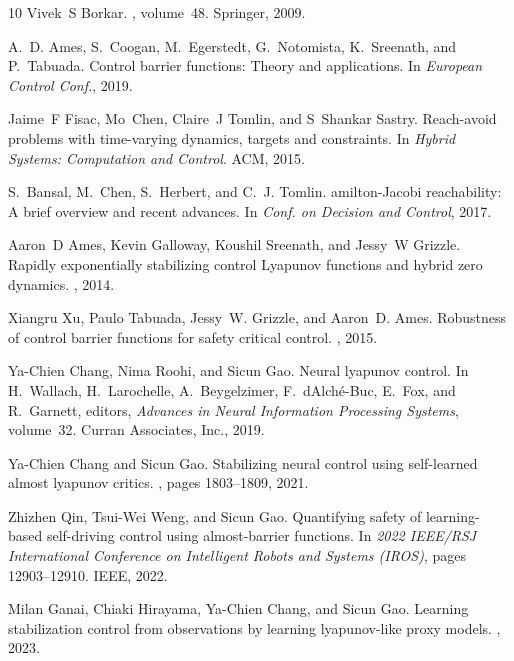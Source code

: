 \documentclass{article}
\theoremstyle{definition}
\begin{document}
\begin{thebibliography}{10}
Vivek~S Borkar.
, volume~48.
\newblock Springer, 2009.

A.~D. {Ames}, S.~{Coogan}, M.~{Egerstedt}, G.~{Notomista}, K.~{Sreenath}, and P.~{Tabuada}.
\newblock Control barrier functions: Theory and applications.
\newblock In {\em European Control Conf.}, 2019.

Jaime~F Fisac, Mo~Chen, Claire~J Tomlin, and S~Shankar Sastry.
\newblock Reach-avoid problems with time-varying dynamics, targets and constraints.
\newblock In {\em Hybrid Systems: Computation and Control}. ACM, 2015.

S.~{Bansal}, M.~{Chen}, S.~{Herbert}, and C.~J. {Tomlin}.
amilton-{J}acobi reachability: A brief overview and recent advances.
\newblock In {\em Conf. on Decision and Control}, 2017.

Aaron~D Ames, Kevin Galloway, Koushil Sreenath, and Jessy~W Grizzle.
\newblock Rapidly exponentially stabilizing control {L}yapunov functions and hybrid zero dynamics.
, 2014.

Xiangru Xu, Paulo Tabuada, Jessy~W. Grizzle, and Aaron~D. Ames.
\newblock Robustness of control barrier functions for safety critical control.
, 2015.

Ya-Chien Chang, Nima Roohi, and Sicun Gao.
\newblock Neural lyapunov control.
\newblock In H.~Wallach, H.~Larochelle, A.~Beygelzimer, F.~d\textquotesingle Alch\'{e}-Buc, E.~Fox, and R.~Garnett, editors, {\em Advances in Neural Information Processing Systems}, volume~32. Curran Associates, Inc., 2019.

Ya-Chien Chang and Sicun Gao.
\newblock Stabilizing neural control using self-learned almost lyapunov critics.
, pages 1803--1809, 2021.

Zhizhen Qin, Tsui-Wei Weng, and Sicun Gao.
\newblock Quantifying safety of learning-based self-driving control using almost-barrier functions.
\newblock In {\em 2022 IEEE/RSJ International Conference on Intelligent Robots and Systems (IROS)}, pages 12903--12910. IEEE, 2022.

Milan Ganai, Chiaki Hirayama, Ya-Chien Chang, and Sicun Gao.
\newblock Learning stabilization control from observations by learning lyapunov-like proxy models.
, 2023.


\end{thebibliography}
\end{document}
